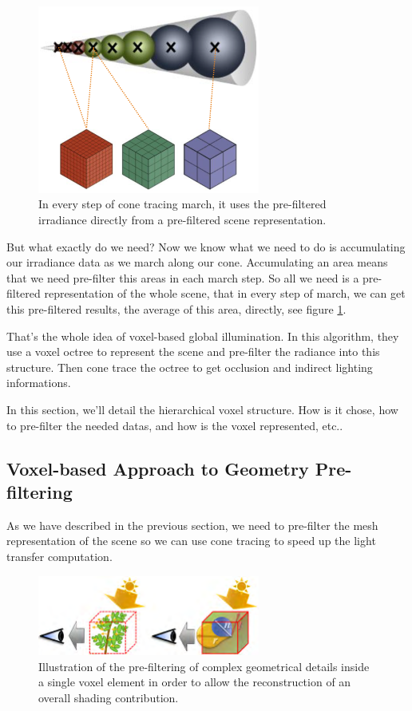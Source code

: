 \begin{figure}
\sidecaption
	\includegraphics[width=0.65\textwidth]{graphics/vct/vct-2-4}
	\caption{In every step of cone tracing march, it uses the pre-filtered irradiance directly from a pre-filtered scene representation.}
	\label{f:vct-pre-filtered-data}
\end{figure}

But what exactly do we need? Now we know what we need to do is accumulating our irradiance data as we march along our cone. Accumulating an area means that we need pre-filter this areas in each march step. So all we need is a pre-filtered representation of the whole scene, that in every step of march, we can get this pre-filtered results, the average of this area, directly, see figure \ref{f:vct-pre-filtered-data}.


That's the whole idea of voxel-based global illumination. In this algorithm, they use a voxel octree to represent the scene and pre-filter the radiance into this structure. Then cone trace the octree to get occlusion and indirect lighting informations. 

In this section, we'll detail the hierarchical voxel structure. How is it chose, how to pre-filter the needed datas, and how is the voxel represented, etc..



\subsection{Voxel-based Approach to Geometry Pre-filtering}
As we have described in the previous section, we need to pre-filter the mesh representation of the scene so we can use cone tracing to speed up the light transfer computation. 

\begin{figure}
\sidecaption
	\includegraphics[width=0.65\textwidth]{graphics/vct/vct-4-1}
	\caption{Illustration of the pre-filtering of complex geometrical details inside a single voxel element in order to allow the reconstruction of an overall shading contribution.}
	\label{f:vct-pre-filtering-assumption}
\end{figure}

